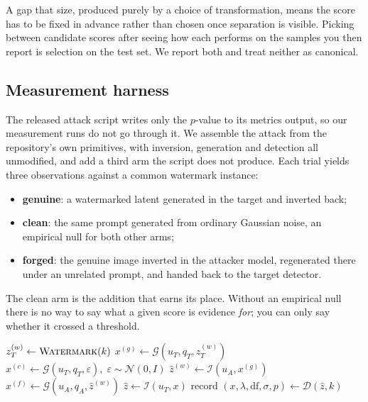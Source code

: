 \documentclass[10pt,twocolumn]{article}
\newcommand{\xstat}{\ensuremath{x}}
\newcommand{\lam}{\ensuremath{\lambda}}
\begin{document}
A gap that size, produced purely by a choice of transformation, means the score has to
be fixed in advance rather than chosen once separation is visible. Picking between
candidate scores after seeing how each performs on the samples you then report is
selection on the test set. We report both and treat neither as canonical.

\subsection{Measurement harness}

The released attack script writes only the $p$-value to its metrics output,
so our measurement runs do not go through it. We assemble the attack from the
repository's own primitives, with inversion, generation and detection all unmodified,
and add a third arm the script does not produce. Each trial yields three observations
against a common watermark instance:

\begin{itemize}\itemsep2pt
\item \textbf{genuine}: a watermarked latent generated in the target and inverted
      back;
\item \textbf{clean}: the same prompt generated from ordinary Gaussian noise, an
      empirical null for both other arms;
\item \textbf{forged}: the genuine image inverted in the attacker model,
      regenerated there under an unrelated prompt, and handed back to the target
      detector.
\end{itemize}

The clean arm is the addition that earns its place. Without an empirical null there is
no way to say what a given score is evidence \emph{for}; you can only say whether it
crossed a threshold.

\begin{algorithm}[t]
\small
\caption{One measurement trial. $u_T$ is the target, $u_A$ the attacker proxy,
$\mathcal{I}$ inversion, $\mathcal{G}$ generation, $\mathcal{D}$ the Tree-Ring
detector and $k$ the key. Prompts $q_T$ and $q_A$ are unrelated.}
\label{alg:trial}
\begin{algorithmic}[1]
\State $z_T^{(w)} \gets \textsc{Watermark}(k)$ 
\State $x^{(g)} \gets \mathcal{G}(u_T, q_T, z_T^{(w)})$ 
\State $x^{(c)} \gets \mathcal{G}(u_T, q_T, \varepsilon),\;
        \varepsilon \sim \mathcal{N}(0, I)$ 
\State $\hat{z}^{(w)} \gets \mathcal{I}(u_A, x^{(g)})$
\State $x^{(f)} \gets \mathcal{G}(u_A, q_A, \hat{z}^{(w)})$ 
  \State $\hat{z} \gets \mathcal{I}(u_T, x)$
  \State record $(\xstat, \lam, \mathrm{df}, \sigma, p)
         \gets \mathcal{D}(\hat{z}, k)$
\EndFor
\end{algorithmic}
\end{algorithm}
\end{document}
